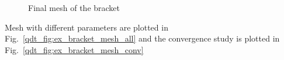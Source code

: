 \begin{figure}
    \centering
    \caption[Final mesh of the bracket]{Final mesh of the bracket}
    \label{qdt_fig:ex_chole_mesh_final}
\end{figure}
%
%
%
%
%
Mesh with different parameters are plotted in Fig.~\ref{qdt_fig:ex_bracket_mesh_all} and the convergence study is plotted in Fig.~\ref{qdt_fig:ex_bracket_mesh_conv}
%
